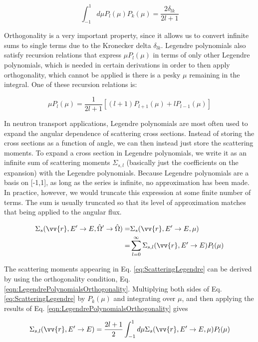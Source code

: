 \documentclass[10pt]{article}
\newcommand{\beq}{\begin{equation}}
\newcommand{\eeq}{\end{equation}}
\newcommand{\beqa}{\begin{equation}\begin{aligned}}
\newcommand{\eeqa}{\end{aligned}\end{equation}}
\newcommand{\hO}{\hat{\Omega}}
\begin{document}
\begin{flushleft}
\beq
\label{eqn:LegendrePolynomialsOrthogonality}
\int_{-1}^{1} d\mu P_l (\mu) P_k (\mu) = \frac{2\delta_{lk}}{2l+1}
\eeq

Orthogonality is a very important property, since it allows us to convert infinite sums to single terms due to the Kronecker delta \(\delta_{lk}\). Legendre polynomials also satisfy recursion relations that express \(\mu P_l(\mu)\) in terms of only other Legendre polynomials, which is needed in certain derivations in order to then apply orthogonality, which cannot be applied is there is a pesky \(\mu\) remaining in the integral. One of these recursion relations is:

\beq
\label{eqn:LegendrePolynomialRecursion1}
\mu P_l(\mu) = \frac{1}{2l+1} \left\lbrack(l+1)P_{l+1}(\mu) + l P_{l-1}(\mu)\right\rbrack
\eeq

In neutron transport applications, Legendre polynomials are most often used to expand the angular dependence of scattering cross sections. Instead of storing the cross sections as a function of angle, we can then instead just store the scattering moments. To expand a cross section in Legendre polynomials, we write it as an infinite sum of scattering moments \(\Sigma_{s,l}\) (basically just the coefficients on the expansion) with the Legendre polynomials. Because Legendre polynomials are a basis on [-1,1], as long as the series is infinite, no approximation has been made. In practice, however, we would truncate this expression at some finite number of terms. The sum is usually truncated so that its level of approximation matches that being applied to the angular flux. 

\beqa
\label{eq:ScatteringLegendre}
\Sigma_s(\vv{r}, E'\rightarrow E, \hO  '\rightarrow\hO  ) =& \Sigma_s(\vv{r}, E'\rightarrow E, \mu) \\
=& \sum_{l=0}^{\infty}\Sigma_{s,l}(\vv{r}, E'\rightarrow E)P_l(\mu)\\
\eeqa

The scattering moments appearing in Eq. \ref{eq:ScatteringLegendre} can be derived by using the orthogonality condition, Eq. \ref{eqn:LegendrePolynomialsOrthogonality}. Multiplying both sides of Eq. \ref{eq:ScatteringLegendre} by \(P_k(\mu)\) and integrating over \(\mu\), and then applying the results of Eq. \ref{eqn:LegendrePolynomialsOrthogonality} gives

\beq
\label{eq:ScatteringMomentsLegendre}
\Sigma_{s,l}(\vv{r}, E'\rightarrow E) = \frac{2l+1}{2}\int_{-1}^{1} d\mu \Sigma_s(\vv{r}, E'\rightarrow E, \mu) P_l(\mu)
\eeq


\end{flushleft}
\end{document}
